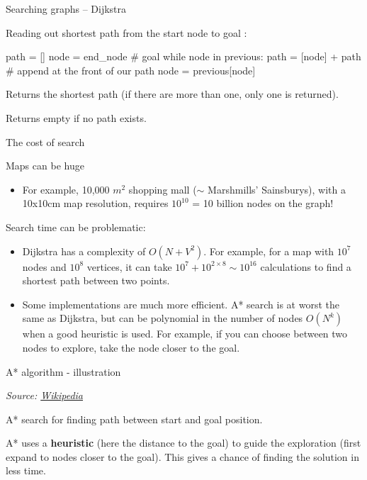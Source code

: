 \documentclass[compress,xcolor=table]{beamer}
\newcommand{\source}[2]{{\tiny\it Source: \href{#1}{#2}}}
\begin{document}
\begin{frame}[fragile]{Searching graphs -- Dijkstra}

    Reading out shortest path from the start node to goal :

\begin{pythoncode}
path = []
node = end_node # goal
while node in previous:
path = [node] + path # append at the front of our path
node = previous[node]
\end{pythoncode}

    Returns the shortest path (if there are more than one, only one is returned).

    Returns empty if no path exists.

\end{frame}

\begin{frame}{The cost of search}

Maps can be huge

\begin{itemize}
    \item For example, 10,000 $m^2$ shopping mall ($\sim$ Marshmills' Sainsburys), with a 10x10cm map
    resolution, requires $10^{10}$ = 10 billion nodes on the graph!
\end{itemize}

Search time can be problematic:

\begin{itemize}
\item Dijkstra has a complexity of $O(N+V^2)$. For example, for a map with
    $10^7$ nodes and $10^8$ vertices, it can take $10^7+10^{2\times 8} \sim
        10^{16}$ calculations to
  find a shortest path between two points.
\item Some implementations are much more efficient. A* search is at worst
  the same as Dijkstra, but can be polynomial in the number of nodes
  $O(N^k)$ when a good heuristic is used. For example, if you can
  choose between two nodes to explore, take the node closer to the goal.
\end{itemize}

\end{frame}

\begin{frame}{A* algorithm - illustration}

    \begin{center}

        \source{http://en.wikipedia.org/wiki/A*_search_algorithm}{Wikipedia}
    \end{center}

    A* search for finding path between start and goal position.

    A* uses a \textbf{heuristic} (here the distance to the goal) to guide the
    exploration (first expand to nodes closer to the goal). This gives a chance of finding
    the solution in less time.

\end{frame}
\end{document}
